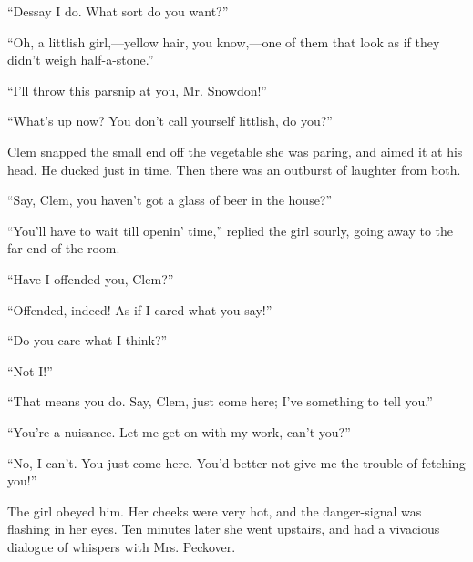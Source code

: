 ``Dessay I do. What sort do you want?''

``Oh, a littlish girl,---yellow hair, you know,---one of them that look
as if they didn't weigh half-a-stone.''

``I'll throw this parsnip at you, Mr. Snowdon!''

``What's up now? You don't call yourself littlish, do you?''

Clem snapped the small end off the vegetable she was paring, and aimed
it at his head. He ducked just in time. Then there was an outburst of
laughter from both.

``Say, Clem, you haven't got a glass of beer in the house?''

``You'll have to wait till openin' time,'' replied the girl sourly,
going away to the far end of the room.

``Have I offended you, Clem?''

{\protect\hypertarget{16}{}{}}``Offended, indeed! As if I cared what you
say!''

``Do you care what I think?''

``Not I!''

``That means you do. Say, Clem, just come here; I've something to tell
you.''

``You're a nuisance. Let me get on with my work, can't you?''

``No, I can't. You just come here. You'd better not give me the trouble
of fetching you!''

The girl obeyed him. Her cheeks were very hot, and the danger-signal was
flashing in her eyes. Ten minutes later she went upstairs, and had a
vivacious dialogue of whispers with Mrs. Peckover.
